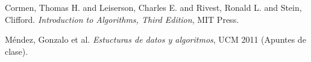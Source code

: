 \begin{thebibliography}{10}

 Cormen, Thomas H. and Leiserson, Charles E. and Rivest, Ronald L. and Stein, Clifford. \textit{Introduction to Algorithms, Third Edition}, MIT Press.  

 Méndez, Gonzalo et al. \textit{Estucturas de datos y algoritmos}, UCM 2011 (Apuntes de clase).
\end{thebibliography}